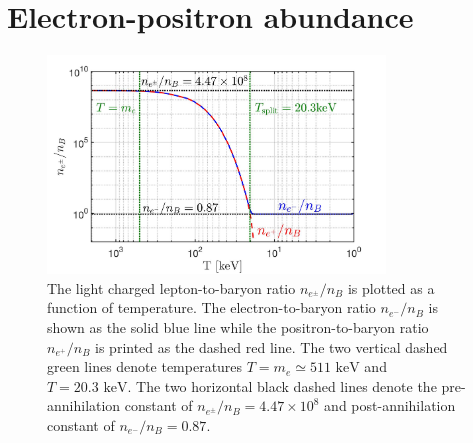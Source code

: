\documentclass[a4paper]{article}
\newcommand*{\keV}{\text{ keV}}
\begin{document}
\section{Electron-positron abundance}
\label{sec:abundance}
\begin{figure}[ht]
    \centering
    \includegraphics[width=0.8\textwidth]{EEPlasmaDensityRatio_new.jpg}
    \caption{The light charged lepton-to-baryon ratio $n_{e^{\pm}}/n_{B}$ is plotted as a function of temperature. The electron-to-baryon ratio $n_{e^{-}}/n_{B}$ is shown as the solid blue line while the positron-to-baryon ratio $n_{e^{+}}/n_{B}$ is printed as the dashed red line. The two vertical dashed green lines denote temperatures $T=m_{e}\simeq511\keV$ and $T=20.3\keV$. The two horizontal black dashed lines denote the pre-annihilation constant of $n_{e^{\pm}}/n_{B}=4.47\times10^{8}$ and post-annihilation constant of $n_{e^{-}}/n_{B}=0.87$.}
    \label{densityratio} 
\end{figure}
\end{document}
